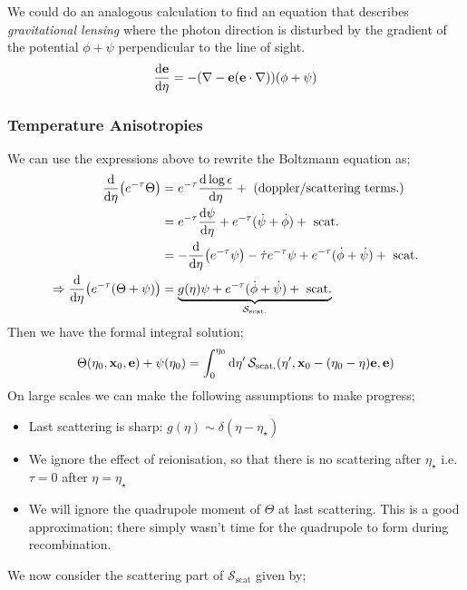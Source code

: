 We could do an analogous calculation to find an equation that describes \emph{gravitational lensing} where the photon direction is disturbed by the gradient of the potential $\phi + \psi$ perpendicular to the line of sight.
\begin{equation}
\frac{\ud \vec{e}}{\ud \eta} = -\left(\nabla - \vec{e}(\vec{e}\cdot\nabla)\right)(\phi + \psi)
\end{equation}
\subsubsection{Temperature Anisotropies}
We can use the expressions above to rewrite the Boltzmann equation as;
\begin{align*}
\frac{\ud}{\ud \eta}\left(e^{-\tau}\Theta\right) &= e^{-\tau}\frac{\ud \log \epsilon}{\ud \eta} + \,\,(\text{doppler/scattering terms.}) \\
&= e^{-\tau}\frac{\ud \psi}{\ud \eta} + e^{-\tau}(\dot{\psi} + \dot{\phi}) + \,\,\text{scat.} \\
&= -\frac{\ud}{\ud \eta}\left(e^{-\tau}\psi\right) - \dot{\tau}e^{-\tau}\psi + e^{-\tau}(\dot{\phi} + \dot{\psi}) + \,\,\text{scat.} \\
\Rightarrow \frac{\ud}{\ud \eta}\left(e^{-\tau}(\Theta + \psi)\right) &= \underbrace{g(\eta)\psi + e^{-\tau}(\dot{\phi} + \dot{\psi}) + \,\,\text{scat.}}_{\mathcal{S}_{\text{scat.}}}
\end{align*}
Then we have the formal integral solution;
\begin{equation*}
\Theta(\eta_0, \vec{x}_0, \vec{e}) + \psi(\eta_0) = \int_0^{\eta_0}{\upd{\eta\pr}\mathcal{S}_{\text{scat.}}\left(\eta\pr, \vec{x}_0 - (\eta_0 - \eta)\vec{e}, \vec{e}\right)}
\end{equation*}
On large scales we can make the following assumptions to make progress;
\begin{itemize}
\item Last scattering is sharp: $g(\eta) \sim \delta(\eta - \eta_\star)$
\item We ignore the effect of reionisation, so that there is no scattering after $\eta_\star$ i.e. $\tau = 0$ after $\eta = \eta_\star$
\item We will ignore the quadrupole moment of $\Theta$ at last scattering. This is a good approximation; there simply wasn't time for the quadrupole to form during recombination.
\end{itemize}
We now consider the scattering part of $\mathcal{S}_{\text{scat}}$ given by;

